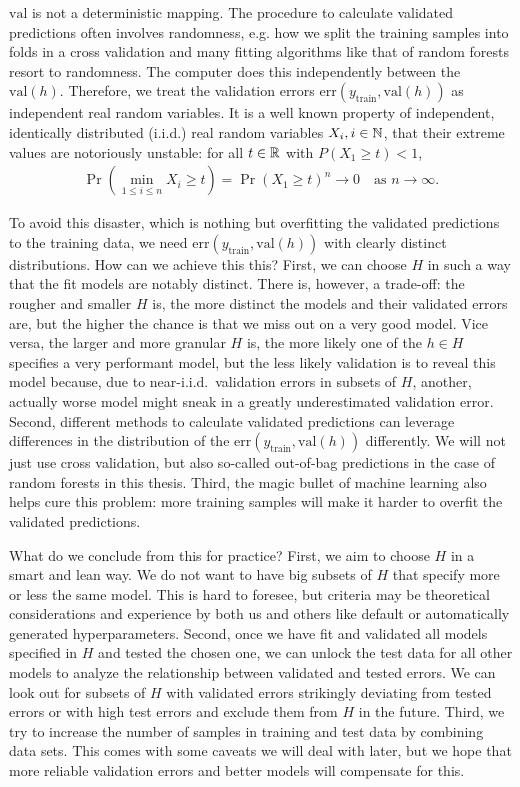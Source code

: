 $\text{val}$ is not a deterministic mapping. The procedure to calculate validated predictions often 
involves randomness, e.g. how we split the training samples into folds in a cross validation and 
many fitting algorithms like that of random forests resort to randomness. The computer does this 
independently between the $\text{val}(h)$. Therefore, we treat the validation errors
$\text{err}(y_\text{train}, \text{val}(h))$ as independent 
real random variables. It is a well known property of independent, identically distributed (i.i.d.) 
real random variables $X_i, i \in \mathbb{N}$, that their extreme values are notoriously unstable: for all 
$t \in \mathbb{R}$ with $P(X_1 \geq t) < 1$, 
\begin{align}
    \Pr\left( \min_{1 \leq i \leq n} X_i \geq t \right) = \Pr(X_1 \geq t)^n \to 0 \quad
    \text{as } n \to \infty.
\end{align}

To avoid this disaster, which is nothing but overfitting the validated predictions to the training 
data, we need $\text{err}(y_\text{train}, \text{val}(h))$ with clearly distinct distributions. 
How can we achieve this this? First, we can choose $H$ in such a way that the fit models are 
notably distinct. There is, however, a trade-off: the rougher and smaller $H$ is, the more distinct 
the models and their validated errors are, but the higher the chance is that we miss out on a very good 
model. Vice versa, the larger and more granular $H$ is, the more likely one of the $h \in H$ 
specifies a very performant model, but the less likely validation is to reveal this model because,
due to near-i.i.d.\ validation errors in subsets of $H$, another, actually worse model might sneak 
in a greatly underestimated validation error. Second, different methods to calculate validated
predictions can leverage differences in the distribution of the 
$\text{err}(y_\text{train}, \text{val}(h))$ differently. We will not just use cross validation, but 
also so-called out-of-bag predictions in the case of random forests in this thesis. Third, the 
magic bullet of machine learning also helps cure this problem: more training samples will make it 
harder to overfit the validated predictions.

What do we conclude from this for practice? First, we aim to choose $H$ in a smart and lean way. 
We do not want to have big subsets of $H$ that specify more or less the same model. This is hard 
to foresee, but criteria may be theoretical considerations and experience by both us and others 
like default or automatically generated hyperparameters. Second, once we have fit and validated 
all models specified in $H$ and tested the chosen one, we can unlock the test data for all other 
models to analyze the relationship between validated and tested errors. We can look out for subsets 
of $H$ with validated errors strikingly deviating from tested errors or with high test errors and 
exclude them from $H$ in the future. Third, we try to increase the number of samples in training 
and test data by combining data sets. This comes with some caveats we will deal with later, but 
we hope that more reliable validation errors and better models will compensate for this.

